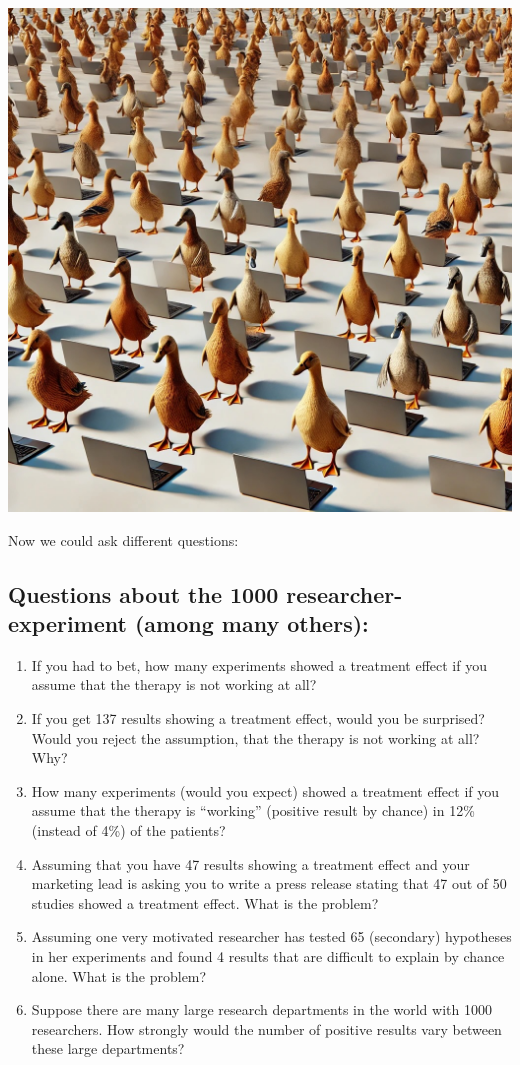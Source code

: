 \documentclass[
]{book}
\providecommand{\tightlist}{%
  \setlength{\itemsep}{0pt}\setlength{\parskip}{0pt}}
\newcommand{\pandocbounded}[1]{#1}
\begin{document}
\pandocbounded{\includegraphics[keepaspectratio]{./images/thousand_researchers_ducks.jpg}}

Now we could ask different questions:

\subsection{Questions about the 1000 researcher-experiment (among many others):}\label{Questions_about_the_1000-researcher_experiment}

\begin{enumerate}
\def\labelenumi{\arabic{enumi}.}
\tightlist
\item
  If you had to bet, how many experiments showed a treatment effect if you assume that the therapy is not working at all?
\item
  If you get 137 results showing a treatment effect, would you be surprised? Would you reject the assumption, that the therapy is not working at all? Why?
\item
  How many experiments (would you expect) showed a treatment effect if you assume that the therapy is ``working'' (positive result by chance) in 12\% (instead of 4\%) of the patients?
\item
  Assuming that you have 47 results showing a treatment effect and your marketing lead is asking you to write a press release stating that 47
  out of 50 studies showed a treatment effect. What is the problem?
\item
  Assuming one very motivated researcher has tested 65 (secondary) hypotheses in her experiments and found 4 results that are difficult to explain by chance alone. What is the problem?
\item
  Suppose there are many large research departments in the world with 1000 researchers. How strongly would the number of positive results vary between these large departments?
\end{enumerate}
\end{document}
